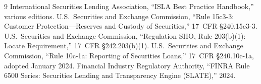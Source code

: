 \documentclass[11pt,a4paper]{article}
\begin{document}
\begin{thebibliography}{9}
 International Securities Lending Association, ``ISLA Best Practice Handbook,'' various editions.
 U.S.\ Securities and Exchange Commission, ``Rule 15c3-3: Customer Protection---Reserves and Custody of Securities,'' 17~CFR \S240.15c3-3.
 U.S.\ Securities and Exchange Commission, ``Regulation SHO, Rule 203(b)(1): Locate Requirement,'' 17~CFR \S242.203(b)(1).
 U.S.\ Securities and Exchange Commission, ``Rule 10c-1a: Reporting of Securities Loans,'' 17~CFR \S240.10c-1a, adopted January 2024.
 Financial Industry Regulatory Authority, ``FINRA Rule 6500 Series: Securities Lending and Transparency Engine (SLATE),'' 2024.
\end{thebibliography}
\end{document}
